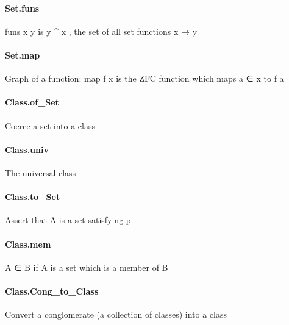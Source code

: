 \documentclass{article}
\begin{document}
\paragraph{Set.funs}
\par
\colorbox[RGB]{253,246,227}{{{{\color[RGB]{101, 123, 131} funs x y }}}} is 
\colorbox[RGB]{253,246,227}{{{{\color[RGB]{101, 123, 131} y \textasciicircum{} x }}}}, the set of all set functions 
\colorbox[RGB]{253,246,227}{{{{\color[RGB]{101, 123, 131} x  }}}{{{\color[RGB]{133, 153, 0} → }}}{{{\color[RGB]{101, 123, 131}  y }}}}\paragraph{Set.map}
\par
Graph of a function: 
\colorbox[RGB]{253,246,227}{{{{\color[RGB]{101, 123, 131} map f x }}}} is the ZFC function which maps 
\colorbox[RGB]{253,246,227}{{{{\color[RGB]{101, 123, 131} a ∈ x }}}} to 
\colorbox[RGB]{253,246,227}{{{{\color[RGB]{101, 123, 131} f a }}}}\paragraph{Class.of\_Set}
\par
Coerce a set into a class
\paragraph{Class.univ}
\par
The universal class
\paragraph{Class.to\_Set}
\par
Assert that 
\colorbox[RGB]{253,246,227}{{{{\color[RGB]{101, 123, 131} A }}}} is a set satisfying 
\colorbox[RGB]{253,246,227}{{{{\color[RGB]{101, 123, 131} p }}}}\paragraph{Class.mem}
\par
\colorbox[RGB]{253,246,227}{{{{\color[RGB]{101, 123, 131} A ∈ B }}}} if 
\colorbox[RGB]{253,246,227}{{{{\color[RGB]{101, 123, 131} A }}}} is a set which is a member of 
\colorbox[RGB]{253,246,227}{{{{\color[RGB]{101, 123, 131} B }}}}\paragraph{Class.Cong\_to\_Class}
\par
Convert a conglomerate (a collection of classes) into a class
\end{document}
